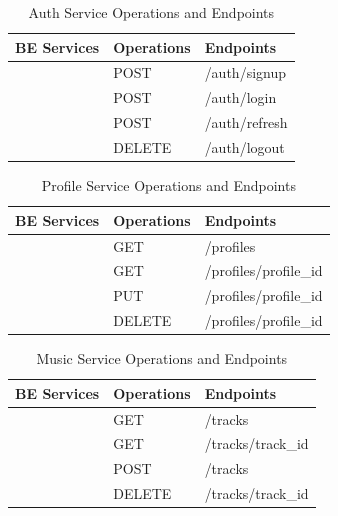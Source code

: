 \documentclass[a4paper,12pt]{article}
\begin{document}
\begin{table}[H]
    \centering
    \renewcommand{\arraystretch}{1.2}
    \setlength{\tabcolsep}{5pt}
    \begin{tabular}{|>{\centering\arraybackslash}m{4cm}|m{3cm}|m{7cm}|}
    \hline
    \textbf{BE Services} & \textbf{Operations} & \textbf{Endpoints} \\
    \hline
    \multirow{4}{*}{\textbf{Auth Service}} 
    & POST & /auth/signup \\
    & POST & /auth/login \\
    & POST & /auth/refresh \\
    & DELETE & /auth/logout \\
    \hline
    \end{tabular}
    \caption{Auth Service Operations and Endpoints}
\end{table}

\begin{table}[H]
    \centering
    \renewcommand{\arraystretch}{1.2}
    \begin{tabular}{|>{\centering\arraybackslash}m{4cm}|m{3cm}|m{7cm}|}
    \hline
    \textbf{BE Services} & \textbf{Operations} & \textbf{Endpoints} \\
    \hline
    \multirow{4}{*}{\textbf{Profile Service}} 
    & GET & /profiles \\
    & GET & /profiles/{profile\_id} \\
    & PUT & /profiles/{profile\_id} \\
    & DELETE & /profiles/{profile\_id} \\
    \hline
    \end{tabular}
    \caption{Profile Service Operations and Endpoints}
\end{table}

\begin{table}[H]
    \centering
    \renewcommand{\arraystretch}{1.2}
    \begin{tabular}{|>{\centering\arraybackslash}m{4cm}|m{3cm}|m{7cm}|}
    \hline
    \textbf{BE Services} & \textbf{Operations} & \textbf{Endpoints} \\
    \hline
    \multirow{4}{*}{\textbf{Music Service}} 
    & GET & /tracks \\
    & GET & /tracks/{track\_id} \\
    & POST & /tracks \\
    & DELETE & /tracks/{track\_id} \\
    \hline
    \end{tabular}
    \caption{Music Service Operations and Endpoints}
\end{table}
\end{document}
